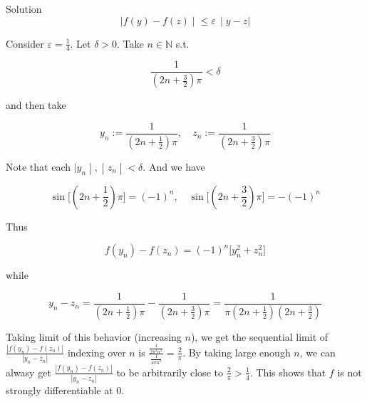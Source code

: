 \begin{qlsolution}{Solution}
\[\left. |f(y) - f(z) \middle| \leq \varepsilon\, \middle| y - z| \right.\]

Consider \(\varepsilon = \frac{1}{4}\). Let \(\delta > 0\). Take \(n \in \mathbb{N}\) s.t.

\[\frac{1}{(2n + \frac{3}{2})\pi} < \delta\]

and then take

\[y_{n} := \frac{1}{\left( {2n + \frac{1}{2}} \right)\pi},\quad z_{n} := \frac{1}{\left( {2n + \frac{3}{2}} \right)\pi}\]

Note that each \(\left. |y_{n} \middle| , \middle| z_{n} \middle| < \delta \right.\). And we have

\[\sin\lbrack(2n + \frac{1}{2})\pi\rbrack = ( - 1)^{n},\quad\sin\lbrack(2n + \frac{3}{2})\pi\rbrack = - ( - 1)^{n}\]

Thus

\[f(y_{n}) - f(z_{n}) = ( - 1)^{n}\lbrack y_{n}^{2} + z_{n}^{2}\rbrack\]

while

\[y_{n} - z_{n} = \frac{1}{\left( {2n + \frac{1}{2}} \right)\pi} - \frac{1}{\left( {2n + \frac{3}{2}} \right)\pi} = \frac{1}{\pi\left( {2n + \frac{1}{2}} \right)\left( {2n + \frac{3}{2}} \right)}\]

Taking limit of this behavior (increasing \(n\)), we get the sequential limit of \(\frac{|f(y_{n}) - f(z_{n})|}{|y_{n} - z_{n}|}\) indexing over \(n\) is \(\frac{\frac{1}{2\pi^{2}n^{2}}}{\frac{1}{4\pi n^{2}}} = \frac{2}{\pi}\). By taking large enough \(n\), we can alwasy get \(\frac{|f(y_{n}) - f(z_{n})|}{|y_{n} - z_{n}|}\) to be arbitrarily close to \(\frac{2}{\pi} > \frac{1}{4}\). This shows that \(f\) is not strongly differentiable at \(0\).

\end{qlsolution}

